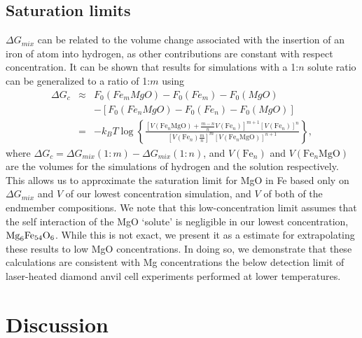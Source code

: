 \subsection{Saturation limits} \label{sec:saturation}

$\Delta G_{mix}$ can be related to the volume change associated with the
insertion of an iron of atom into hydrogen, as other contributions are
constant with respect concentration. It can be shown that results for
simulations with a 1:$n$ solute ratio can be generalized to a ratio of
1:$m$ using
\begin{eqnarray}
  \Delta G_c &\approx& F_0(Fe_mMgO)-F_0(Fe_m)-F_0(MgO) \nonumber \\ && -
  \left[F_0(Fe_nMgO)-F_0(Fe_n)-F_0(MgO)\right] \nonumber \\ &=&
  -k_BT\log\left\{ \frac{\left[V(\mathrm{Fe}_n\mathrm{MgO}) +
    \frac{m-n}{n}V(\mathrm{Fe}_n)\right]^{m+1}
    \left[V(\mathrm{Fe}_n)\right]^{n}}
    {\left[V(\mathrm{Fe}_n)\frac{m}{n}\right]^m
    \left[V(\mathrm{Fe}_n\mathrm{MgO})\right]^{n + 1}} \right\},
\end{eqnarray}
where $\Delta G_c = \Delta G_{mix}(1:m)- \Delta G_{mix}(1:n)$, and
$V(\mathrm{Fe}_n)$ and $V(\mathrm{Fe}_n\mathrm{MgO})$ are the volumes for
the simulations of hydrogen and the solution respectively. This allows us
to approximate the saturation limit for MgO in Fe based only on $\Delta
G_{mix}$ and $V$ of our lowest concentration simulation, and $V$ of both of
the endmember compositions.  We note that this low-concentration limit
assumes that the self interaction of the MgO `solute' is negligible in our
lowest concentration, $\rm{Mg}_{6}\rm{Fe}_{54}\rm{O}_{6}$. While this is
not exact, we present it as a estimate for extrapolating these results to
low MgO concentrations. In doing so, we demonstrate that these calculations
are consistent with Mg concentrations the below detection limit of
laser-heated diamond anvil cell experiments performed at lower
temperatures.

\section{Discussion} \label{sec:discussion}

